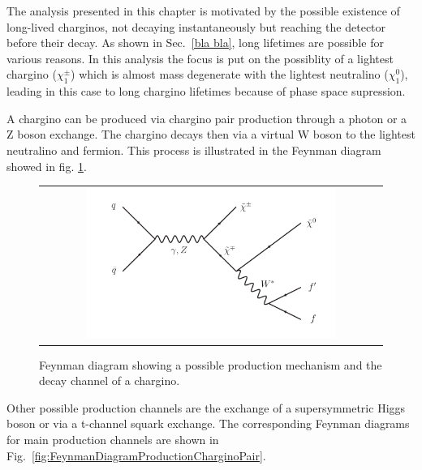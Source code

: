 The analysis presented in this chapter is motivated by the possible existence of long-lived charginos, not decaying instantaneously but reaching the detector before their decay.
As shown in Sec.~\ref{bla bla}, long lifetimes are possible for various reasons. 
In this analysis the focus is put on the possiblity of a lightest chargino ($\chi^{\pm}_1$) which is almost mass degenerate with the lightest neutralino ($\chi^{0}_1$), leading in this case to long chargino lifetimes because of phase space supression.

A chargino can be produced via chargino pair production through a photon or a Z boson exchange. The chargino decays then via a virtual W boson to the lightest neutralino and fermion.
This process is illustrated in the Feynman diagram showed in fig. \ref{fig:FeynmanDiagram}.
\begin{figure}[!ht]
  \centering 
  \begin{tabular}{c}
    \includegraphics[width=0.75\textwidth]{figures/analysis/ChiChi_ProductionAndDecay.pdf}
  \end{tabular}
  \caption{Feynman diagram showing a possible production mechanism and the decay channel of a chargino.}
  \label{fig:FeynmanDiagram}
\end{figure}
Other possible production channels are the exchange of a supersymmetric Higgs boson or via a t-channel squark exchange. 
The corresponding Feynman diagrams for main production channels are shown in Fig.~\ref{fig:FeynmanDiagramProductionCharginoPair}.
